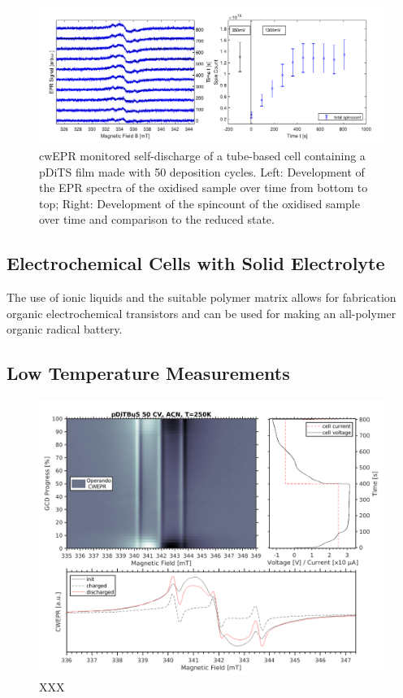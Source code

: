 \begin{figure}[h]
\center
	\includegraphics[width=1\textwidth]{./operando_epr/figures/self_discharge/DOM_DITS_SELF_DISCHARGE.pdf}
	\caption{cwEPR monitored self-discharge of a tube-based cell containing a pDiTS film made with 50 deposition cycles. Left: Development of the EPR spectra of the oxidised sample over time from bottom to top; Right: Development of the spincount of the oxidised sample over time and comparison to the reduced state.~\cite{DOM}}
	\label{fig:self_discharge_DOM}
\end{figure}




\subsection{Electrochemical Cells with Solid Electrolyte}
The use of ionic liquids and the suitable polymer matrix allows for fabrication organic electrochemical transistors and can be used for making an all-polymer organic radical battery.




\subsection{Low Temperature Measurements}
\begin{figure}[h]
\center
	\includegraphics[width=1\textwidth]{./operando_epr/figures/slowcharge_231117_liquid_250K.pdf}
	\caption{XXX}
	\label{fig:operando_cold_cycle}
\end{figure}

